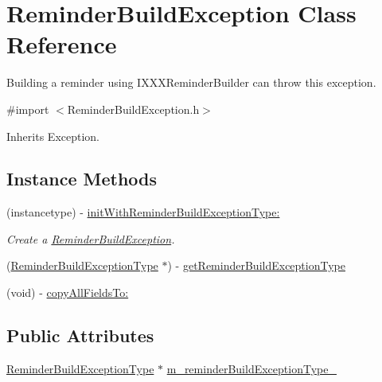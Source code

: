 \hypertarget{interface_reminder_build_exception}{}\section{Reminder\+Build\+Exception Class Reference}
\label{interface_reminder_build_exception}


Building a reminder using I\+X\+X\+X\+Reminder\+Builder can throw this exception.  




{\ttfamily \#import $<$Reminder\+Build\+Exception.\+h$>$}



Inherits Exception.

\subsection*{Instance Methods}
\begin{DoxyCompactItemize}
\item 
(instancetype) -\/ \hyperlink{interface_reminder_build_exception_ab77a2462b52e2a4f566f996d6d32714d}{init\+With\+Reminder\+Build\+Exception\+Type\+:}
\begin{DoxyCompactList}\small\item\em Create a \hyperlink{interface_reminder_build_exception}{Reminder\+Build\+Exception}. \end{DoxyCompactList}\item 
(\hyperlink{interface_reminder_build_exception_type}{Reminder\+Build\+Exception\+Type} $\ast$) -\/ \hyperlink{interface_reminder_build_exception_a7f3c8039f64620a62d248867f03c724f}{get\+Reminder\+Build\+Exception\+Type}
\item 
(void) -\/ \hyperlink{interface_reminder_build_exception_ab1c984e70878617e37ba505a52403ad6}{copy\+All\+Fields\+To\+:}
\end{DoxyCompactItemize}
\subsection*{Public Attributes}
\begin{DoxyCompactItemize}
\item 
\hyperlink{interface_reminder_build_exception_type}{Reminder\+Build\+Exception\+Type} $\ast$ \hyperlink{interface_reminder_build_exception_ab2ea0f4a4eb024782635687cdff5ae9a}{m\+\_\+reminder\+Build\+Exception\+Type\+\_\+}
\end{DoxyCompactItemize}


